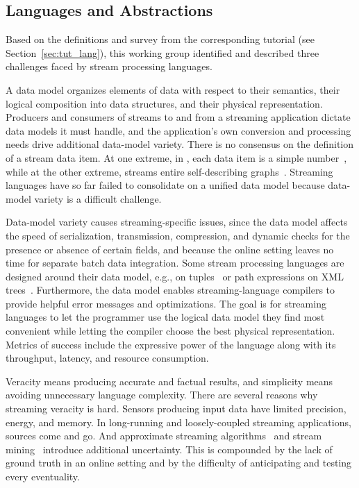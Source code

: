 \subsection{Languages and Abstractions}\label{sec:wg_lang}

Based on the definitions and survey from the corresponding tutorial
(see Section~\ref{sec:tut_lang}), this working group identified and
described three challenges faced by stream processing languages.

A data model organizes elements of data with respect to
their semantics, their logical composition into data structures, and
their physical representation. Producers and consumers of streams to
and from a streaming application dictate data models it must handle,
and the application's own conversion and processing needs drive
additional data-model variety.  There is no consensus on the definition of a stream
data item. At one extreme, in , each data item is a simple
number~\cite{thies_et_al_2002}, while at the other extreme, \mbox{}
streams entire self-describing graphs~\cite{barbieri_et_al_2009}.
Streaming languages have so far failed to consolidate on a unified data model
because data-model variety is a difficult challenge.

Data-model variety causes streaming-specific issues, since the data
model affects the speed of serialization, transmission, compression,
and dynamic checks for the presence or absence of certain fields, and
because the online setting leaves no time for separate batch data
integration. Some stream processing languages are designed around
their data model, e.g.,  on tuples~\cite{arasu_babu_widom_2006} or
path expressions on XML trees~\cite{diao_et_al_2002}. Furthermore, the
data model enables streaming-language compilers to provide helpful
error messages and optimizations. The goal is for streaming languages to let the programmer use the
logical data model they find most convenient while letting the
compiler choose the best physical representation. Metrics of success
include the expressive power of the language along with its throughput,
latency, and resource consumption.

Veracity means producing accurate and factual results, and
simplicity means avoiding unnecessary language complexity. There are
several reasons why streaming veracity is hard. Sensors producing
input data have limited precision, energy, and memory. In
long-running and loosely-coupled streaming applications,
sources come and go. And approximate streaming
algorithms~\cite{babcock_et_al_2002} and stream
mining~\cite{gaber_zaslavsky_krishnaswamy_2005} introduce additional
uncertainty. This is compounded by the lack of ground truth in an
online setting and by the difficulty of anticipating and testing
every eventuality.

